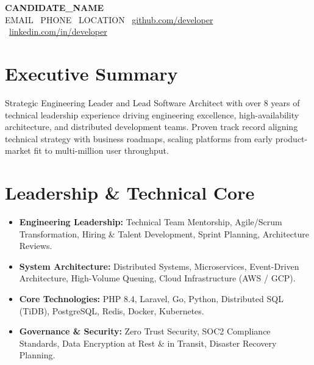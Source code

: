 \documentclass[10pt,a4paper]{article}
\begin{document}
\begin{center}
    {\huge \textbf{{{CANDIDATE_NAME}}}}\\[3pt]
    \small {{EMAIL}} \textbar\ {{PHONE}} \textbar\ {{LOCATION}} \textbar\ \href{https://github.com/candidate}{github.com/developer} \textbar\ \href{https://linkedin.com/in/candidate}{linkedin.com/in/developer}
\end{center}

\vspace{-4pt}
\section{Executive Summary}
Strategic Engineering Leader and Lead Software Architect with over 8 years of technical leadership experience driving engineering excellence, high-availability architecture, and distributed development teams. Proven track record aligning technical strategy with business roadmaps, scaling platforms from early product-market fit to multi-million user throughput.

\section{Leadership \& Technical Core}
\begin{itemize}
    \item \textbf{Engineering Leadership:} Technical Team Mentorship, Agile/Scrum Transformation, Hiring \& Talent Development, Sprint Planning, Architecture Reviews.
    \item \textbf{System Architecture:} Distributed Systems, Microservices, Event-Driven Architecture, High-Volume Queuing, Cloud Infrastructure (AWS / GCP).
    \item \textbf{Core Technologies:} PHP 8.4, Laravel, Go, Python, Distributed SQL (TiDB), PostgreSQL, Redis, Docker, Kubernetes.
    \item \textbf{Governance \& Security:} Zero Trust Security, SOC2 Compliance Standards, Data Encryption at Rest \& in Transit, Disaster Recovery Planning.
\end{itemize}
\end{document}
